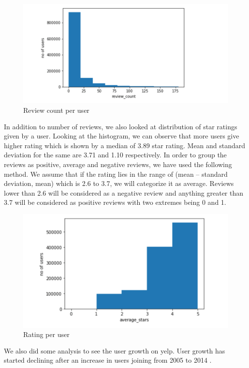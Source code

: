 \documentclass[11pt]{article}
\begin{document}
			\begin{figure}[h]
					\centering
					\includegraphics[scale=0.5]{h_user_review.png}
					\caption{Review count per user}
			\end{figure}
		  In addition to number of reviews, we also looked at distribution of star ratings given by a user. Looking at the histogram, we can observe that more users give higher rating which is shown by a median of 3.89 star rating. Mean and standard deviation for the same are 3.71 and 1.10 respectively. In order to group the reviews as positive, average and negative reviews, we have used the following method. We assume that if the rating lies in the range of (mean – standard deviation, mean) which is 2.6 to 3.7, we will categorize it as average. Reviews lower than 2.6 will be considered as a negative review and anything greater than 3.7 will be considered as positive reviews with two extremes being 0 and 1. 
		 
		  \begin{figure}[h]
		  	\centering
		  	\includegraphics[scale=0.7] {h_user_rating.png}
		  	\caption{Rating per user}
		  \end{figure}
	     We also did some analysis to see the user growth on yelp. User growth has started declining after an increase in users joining from 2005 to 2014 .
	     
\end{document}
